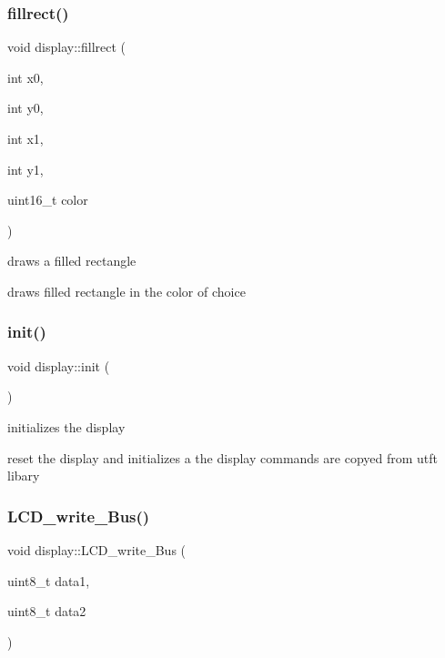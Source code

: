 \subsubsection{\texorpdfstring{fillrect()}{fillrect()}}
{\footnotesize\ttfamily void display\+::fillrect (\begin{DoxyParamCaption}\item[{int}]{x0,  }\item[{int}]{y0,  }\item[{int}]{x1,  }\item[{int}]{y1,  }\item[{uint16\+\_\+t}]{color }\end{DoxyParamCaption})}



draws a filled rectangle 

draws filled rectangle in the color of choice \mbox{\label{classdisplay_aa0b94eb3cb43b47dc720542cf7d1da9b}} 
\subsubsection{\texorpdfstring{init()}{init()}}
{\footnotesize\ttfamily void display\+::init (\begin{DoxyParamCaption}{ }\end{DoxyParamCaption})}



initializes the display 

reset the display and initializes a the display commands are copyed from utft libary \mbox{\label{classdisplay_a11803b9582f7336d28f2dc69be19bcfe}} 
\subsubsection{\texorpdfstring{L\+C\+D\+\_\+write\+\_\+\+Bus()}{LCD\_write\_Bus()}}
{\footnotesize\ttfamily void display\+::\+L\+C\+D\+\_\+write\+\_\+\+Bus (\begin{DoxyParamCaption}\item[{uint8\+\_\+t}]{data1,  }\item[{uint8\+\_\+t}]{data2 }\end{DoxyParamCaption})}




